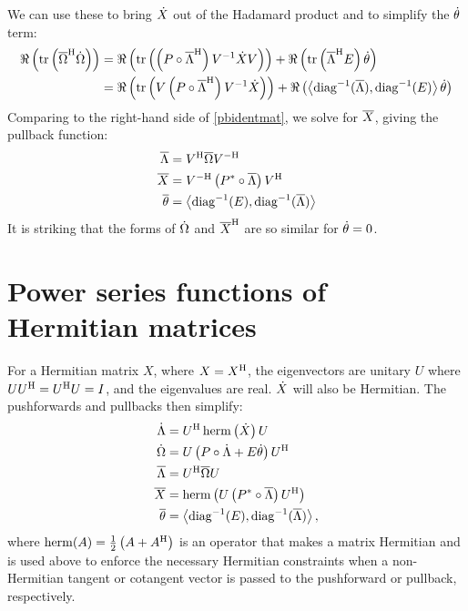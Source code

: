 \documentclass[../main.tex]{subfiles}
\begin{document}
\begin{refsection}
We can use these to bring $\dot{X}$ out of the Hadamard product and to simplify the $\dot{\theta}$ term:
\begin{align*}
\Re \left( \operatorname{tr} \left( {\overline{\Omega}}^\mathrm{H} \dot{\Omega} \right) \right)
  &= \Re \left( \operatorname{tr} \left(  \left( P \circ {\overline{\Lambda}}^\mathrm{H} \right) V^{-1} \dot{X} V \right) \right) +
     \Re \left( \operatorname{tr} \left( {\overline{\Lambda}}^\mathrm{H} E \right) \dot{\theta} \right)\\
  &= \Re \left( \operatorname{tr} \left( V \left( P \circ {\overline{\Lambda}}^\mathrm{H} \right) V^{-1} \dot{X} \right) \right) +
     \Re \left( \left\langle \operatorname{diag}^{-1}(\overline{\Lambda}), \operatorname{diag}^{-1}(E) \right\rangle \dot{\theta} \right)
\end{align*}
Comparing to the right-hand side of \eqref{pbidentmat}, we solve for $\overline{X}$, giving the pullback function:
\begin{align*}
\overline{\Lambda} &= {V}^\mathrm{H} \overline{\Omega} {V}^{-\mathrm{H}}\\
\overline{X} &= {V}^{-\mathrm{H}} \left( {P}^* \circ \overline{\Lambda} \right) {V}^\mathrm{H}\\
\overline{\theta} &= \left\langle \operatorname{diag}^{-1}(E), \operatorname{diag}^{-1}(\overline{\Lambda}) \right\rangle
\end{align*}
It is striking that the forms of $\dot{\Omega}$ and ${\overline{X}}^\mathrm{H}$ are so similar for $\dot{\theta}=0$.

\section{Power series functions of Hermitian matrices}\label{power-series-functions-of-hermitian-matrices}

For a Hermitian matrix $X$, where $X = {X}^\mathrm{H}$, the eigenvectors are unitary $U$ where $U {U}^\mathrm{H} = {U}^\mathrm{H} U = I$, and the eigenvalues are real.
$\dot{X}$ will also be Hermitian.
The pushforwards and pullbacks then simplify:
\begin{align*}
\dot{\Lambda} &= {U}^\mathrm{H} \operatorname{herm} \left( \dot{X} \right) U\\
\dot{\Omega} &= U \left( P \circ \dot{\Lambda} + E \dot{\theta} \right) {U}^\mathrm{H}\\
\overline{\Lambda} &= {U}^\mathrm{H} \overline{\Omega} U\\
\overline{X} &= \operatorname{herm} \left( U \left( {P}^* \circ \overline{\Lambda} \right) {U}^\mathrm{H} \right)\\
\overline{\theta} &= \left\langle \operatorname{diag}^{-1}(E), \operatorname{diag}^{-1}(\overline{\Lambda}) \right\rangle,
\end{align*}
where $\operatorname{herm}(A) = \frac{1}{2} \left( A + {A}^\mathrm{H} \right)$ is an operator that makes a matrix Hermitian and is used above to enforce the necessary Hermitian constraints when a non-Hermitian tangent or cotangent vector is passed to the pushforward or pullback, respectively.


\end{refsection}
\end{document}
